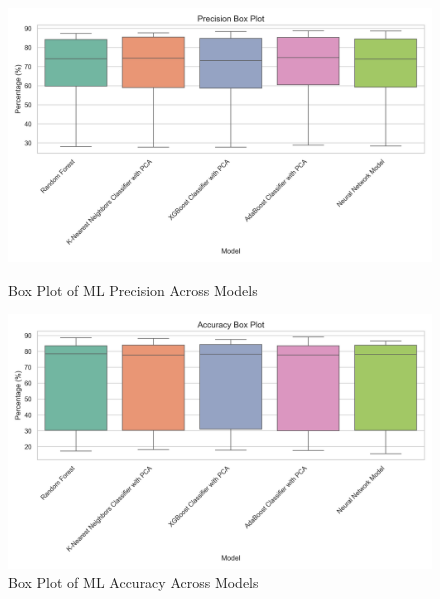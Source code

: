 \begin{figure}[H]
	\centering
	\begin{minipage}{0.48\textwidth}
		\centering
		\includegraphics[width=\linewidth]{img/paper_2/Precision_box_plot}
		\caption{Box Plot of ML Precision Across Models}
		\label{fig:precisionboxplot}
	\end{minipage}
	\hfill
	\begin{minipage}{0.48\textwidth}
		\centering
		\includegraphics[width=\linewidth]{img/paper_2/Accuracy_box_plot}
		\caption{Box Plot of ML Accuracy Across Models}
		\label{fig:accuracyboxplot}
	\end{minipage}
\end{figure}
